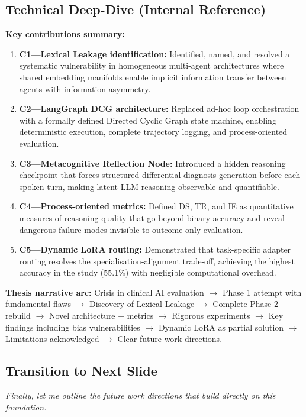 \subsection*{Technical Deep-Dive (Internal Reference)}
{\color{techgray}
\textbf{Key contributions summary:}
\begin{enumerate}
  \item \textbf{C1---Lexical Leakage identification:} Identified, named, and resolved a systematic vulnerability in homogeneous multi-agent architectures where shared embedding manifolds enable implicit information transfer between agents with information asymmetry.
  \item \textbf{C2---LangGraph DCG architecture:} Replaced ad-hoc loop orchestration with a formally defined Directed Cyclic Graph state machine, enabling deterministic execution, complete trajectory logging, and process-oriented evaluation.
  \item \textbf{C3---Metacognitive Reflection Node:} Introduced a hidden reasoning checkpoint that forces structured differential diagnosis generation before each spoken turn, making latent LLM reasoning observable and quantifiable.
  \item \textbf{C4---Process-oriented metrics:} Defined DS, TR, and IE as quantitative measures of reasoning quality that go beyond binary accuracy and reveal dangerous failure modes invisible to outcome-only evaluation.
  \item \textbf{C5---Dynamic LoRA routing:} Demonstrated that task-specific adapter routing resolves the specialisation-alignment trade-off, achieving the highest accuracy in the study (55.1\%) with negligible computational overhead.
\end{enumerate}

\textbf{Thesis narrative arc:} Crisis in clinical AI evaluation $\to$ Phase 1 attempt with fundamental flaws $\to$ Discovery of Lexical Leakage $\to$ Complete Phase 2 rebuild $\to$ Novel architecture + metrics $\to$ Rigorous experiments $\to$ Key findings including bias vulnerabilities $\to$ Dynamic LoRA as partial solution $\to$ Limitations acknowledged $\to$ Clear future work directions.
}

\subsection*{Transition to Next Slide}
{\color{transgreen}
\textit{Finally, let me outline the future work directions that build directly on this foundation.}
}

